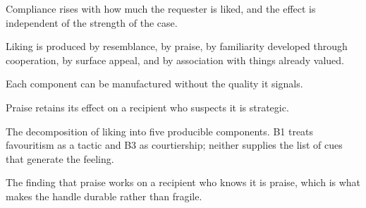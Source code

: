 

\begin{distilled}
  \item Compliance rises with how much the requester is liked, and the effect is independent of the strength of the case.
  \item Liking is produced by resemblance, by praise, by familiarity developed through cooperation, by surface appeal, and by association with things already valued.
  \item Each component can be manufactured without the quality it signals.
  \item Praise retains its effect on a recipient who suspects it is strategic.
\end{distilled}

\begin{unique}
  \item The decomposition of liking into five producible components. B1 treats favouritism as a tactic and B3 as courtiership; neither supplies the list of cues that generate the feeling.
  \item The finding that praise works on a recipient who knows it is praise, which is what makes the handle durable rather than fragile.
\end{unique}
